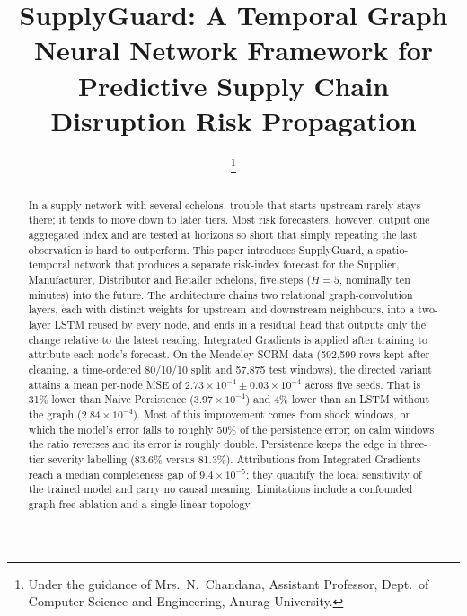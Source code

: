 \documentclass[conference]{IEEEtran}
\begin{document}
\title{SupplyGuard: A Temporal Graph Neural Network Framework for Predictive Supply Chain Disruption Risk Propagation}

\author{
\and
{}
\and
{}
\thanks{Under the guidance of Mrs.\ N.\ Chandana, Assistant Professor, Dept.\ of Computer Science and Engineering, Anurag University.}
}

\maketitle

\begin{abstract}
In a supply network with several echelons, trouble that starts upstream rarely stays there; it tends to move down to later tiers. Most risk forecasters, however, output one aggregated index and are tested at horizons so short that simply repeating the last observation is hard to outperform. This paper introduces SupplyGuard, a spatio-temporal network that produces a separate risk-index forecast for the Supplier, Manufacturer, Distributor and Retailer echelons, five steps ($H=5$, nominally ten minutes) into the future. The architecture chains two relational graph-convolution layers, each with distinct weights for upstream and downstream neighbours, into a two-layer LSTM reused by every node, and ends in a residual head that outputs only the change relative to the latest reading; Integrated Gradients is applied after training to attribute each node's forecast. On the Mendeley SCRM data (592,599 rows kept after cleaning, a time-ordered 80/10/10 split and 57,875 test windows), the directed variant attains a mean per-node MSE of $2.73\times10^{-4}\pm0.03\times10^{-4}$ across five seeds. That is 31\% lower than Naive Persistence ($3.97\times10^{-4}$) and 4\% lower than an LSTM without the graph ($2.84\times10^{-4}$). Most of this improvement comes from shock windows, on which the model's error falls to roughly 50\% of the persistence error; on calm windows the ratio reverses and its error is roughly double. Persistence keeps the edge in three-tier severity labelling (83.6\% versus 81.3\%). Attributions from Integrated Gradients reach a median completeness gap of $9.4\times10^{-5}$; they quantify the local sensitivity of the trained model and carry no causal meaning. Limitations include a confounded graph-free ablation and a single linear topology.
\end{abstract}
\end{document}
